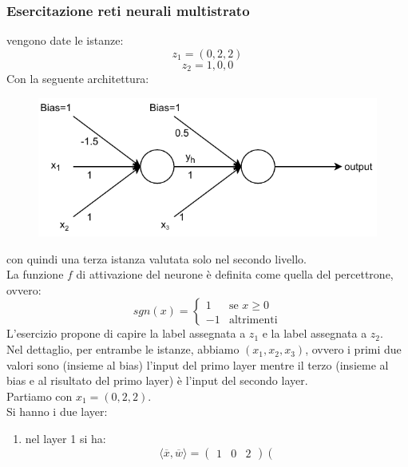 							\subsubsection{Esercitazione reti neurali multistrato}
							\begin{esercizio}
								vengono date le istanze:
								\[z_1=(0, 2, 2)\]
								\[z_2=1, 0, 0\]
								Con la seguente architettura:
								\begin{figure}[H]
									\centering
									\includegraphics[scale = 0.9]{img/per2.pdf}
								\end{figure}
								con quindi una terza istanza valutata solo nel secondo livello.\\
								La funzione $f$ di attivazione del neurone è definita come quella del
								percettrone, ovvero:
								\[sgn(x)=
									\begin{cases}
										1  & \mbox{se } x\geq 0 \\
										-1 & \mbox{altrimenti}  
									\end{cases}
								\]
								L'esercizio propone di capire la label assegnata a $z_1$ e la label assegnata
								a $z_2$.\\
								Nel dettaglio, per entrambe le istanze, abbiamo $(x_1, x_2, x_3)$, ovvero i
								primi due valori sono (insieme al bias) l'input del primo layer mentre il
								terzo (insieme al bias e al risultato del primo layer) è l'input del secondo
								layer.\\
								Partiamo con $x_1=(0, 2, 2)$.\\
								Si hanno i due layer:
								\begin{enumerate}
									\item nel layer 1 si ha:
									      \[\langle \overline{x},\overline{w}\rangle=
									      	\left(\begin{matrix}
									      	1 & 0 & 2
									      	\end{matrix}\right)
									      	\left(
\]
\end{enumerate}
\end{esercizio}
